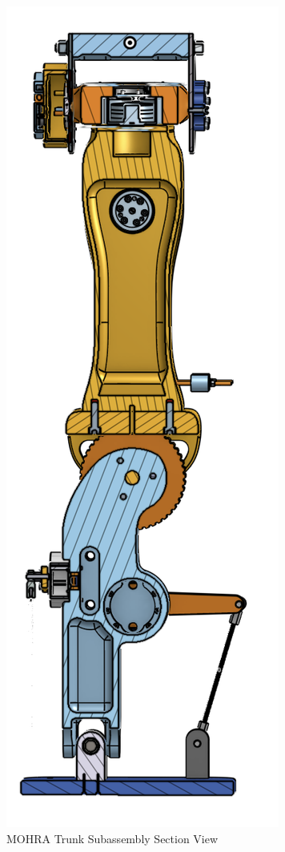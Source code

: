 \documentclass{article}
\begin{document}
\begin{figure}[H]
    \centering
    \includegraphics[scale=0.8]{assets/Design Presentation/Leg Section View.png}
    \caption{MOHRA Trunk Subassembly Section View}
    \label{fig:enter-label}
\end{figure}
\end{document}
